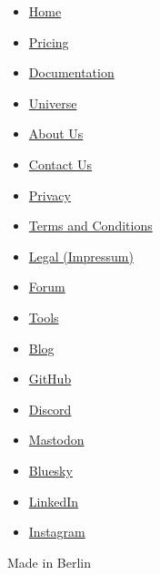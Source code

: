 \begin{itemize}
\tightlist
\item
  \href{/}{Home}
\item
  \href{/pricing/}{Pricing}
\item
  \href{/docs/}{Documentation}
\item
  \href{/universe/}{Universe}
\item
  \href{/about/}{About Us}
\item
  \href{/contact/}{Contact Us}
\item
  \href{/privacy/}{Privacy}
\item
  \href{https://typst.app/terms}{Terms and Conditions}
\item
  \href{/legal/}{Legal (Impressum)}
\end{itemize}

\begin{itemize}
\tightlist
\item
  \href{https://forum.typst.app}{Forum}
\item
  \href{/tools/}{Tools}
\item
  \href{/blog/}{Blog}
\item
  \href{https://github.com/typst/}{GitHub}
\item
  \href{https://discord.gg/2uDybryKPe}{Discord}
\item
  \href{https://mastodon.social/@typst}{Mastodon}
\item
  \href{https://bsky.app/profile/typst.app}{Bluesky}
\item
  \href{https://www.linkedin.com/company/typst/}{LinkedIn}
\item
  \href{https://instagram.com/typstapp/}{Instagram}
\end{itemize}

Made in Berlin
